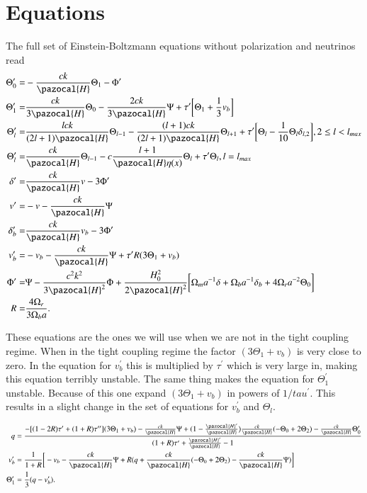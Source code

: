 \documentclass[a4paper]{report}
\begin{document}
\section{Equations}\label{sec:Equations}
The full set of Einstein-Boltzmann equations without polarization and neutrinos read
\begin{align}
 \Theta^\prime_0 =& -\frac{ck}{\pazocal{H}}\Theta_1 - \Phi^\prime\\
 \Theta^\prime_1 =& \frac{ck}{3\pazocal{H}}\Theta_0 - \frac{2ck}{3\pazocal{H}}\Psi + \tau^\prime\bigg[\Theta_1+\frac{1}{3}v_b\bigg]\\
 \Theta_l^\prime =& \frac{lck}{(2l+1)\pazocal{H}}\Theta_{l-1} - \frac{(l+1)ck}{(2l+1)\pazocal{H}}\Theta_{l+1} + \tau^\prime\bigg[\Theta_l-\frac{1}{10}\Theta_l\delta_{l,2} \bigg], 2\le l < l_{max}\\
 \Theta_l^\prime =& \frac{ck}{\pazocal{H}}\Theta_{l-1} - c\frac{l+1}{\pazocal{H}\eta(x)}\Theta_l + \tau^\prime\Theta_l, l=l_{max}\\
 \delta^\prime =&\frac{ck}{\pazocal{H}}v -3\Phi^\prime\\
 v^\prime =& -v -\frac{ck}{\pazocal{H}}\Psi\\
 \delta^\prime_b =& \frac{ck}{\pazocal{H}}v_b - 3\Phi^\prime\\
 v_b^\prime =& -v_b - \frac{ck}{\pazocal{H}}\Psi +\tau^\prime R(3\Theta_1+v_b)\\
 \Phi^\prime =& \Psi - \frac{c^2 k^2}{3\pazocal{H}^2}\Phi + \frac{H_0^2}{2\pazocal{H}^2}\bigg[\Omega_m a^{-1}\delta + \Omega_b a^{-1}\delta_b +4\Omega_r a^{-2}\Theta_0 \bigg]\\
 R =& \frac{4\Omega_r}{3\Omega_b a}.
\end{align}

These equations are the ones we will use when we are not in the tight coupling regime. When in the tight coupling regime the factor $(3\Theta_1+v_b)$ is very close to zero. In the equation for $v_b^\prime$ this is multiplied by $\tau^\prime$ which is very large in, making this equation terribly unstable. The same thing makes the equation for $\Theta^\prime_1$ unstable. Because of this one expand $(3\Theta_1+v_b)$ in powers of $1/tau^\prime$. This results in 
a slight change in the set of equations for $v_b^\prime$ and $\Theta_l$.

\begin{align} 
q &= \frac{-[(1-2R)\tau^\prime + (1+R)\tau^{\prime\prime}](3\Theta_1+v_b) - \frac{ck}{\pazocal{H}}\Psi + (1-\frac{\pazocal{H}^\prime}{\pazocal{H}})\frac{ck}{\pazocal{H}}(-\Theta_0+2\Theta_2) - \frac{ck}{\pazocal{H}}\Theta_0^\prime} {(1+R)\tau^\prime + \frac{\pazocal{H}^\prime}{\pazocal{H}} - 1}\\
v_b^\prime &= \frac{1}{1+R}\bigg[ -v_b - \frac{ck}{\pazocal{H}}\Psi + R(q + \frac{ck}{\pazocal{H}}(-\Theta_0+2\Theta_2)-\frac{ck}{\pazocal{H}}\Psi) \bigg]\\
\Theta_1^\prime &= \frac{1}{3}(q - v_b^\prime).
 \end{align}
\end{document}
